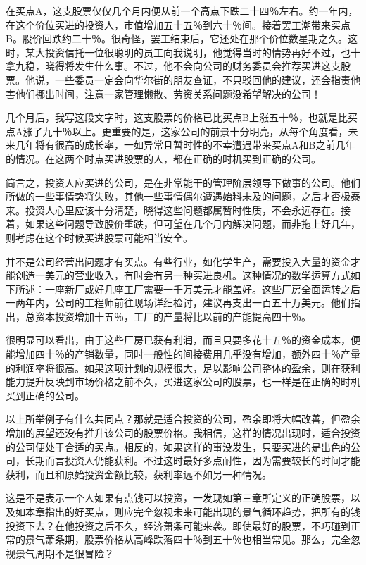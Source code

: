 \documentclass[UTF8,a4paper,zihao=-4,fontset = windows]{ctexart} %
\begin{document}
在买点A，这支股票仅仅几个月内便从前一个高点下跌二十四％左右。约一年内，在这个价位买进的投资人，市值增加五十五％到六十％间。接着罢工潮带来买点B。股价回跌约二十％。很奇怪，罢工结束后，它还处在那个价位数星期之久。这时，某大投资信托一位很聪明的员工向我说明，他觉得当时的情势再好不过，也十拿九稳，晓得将发生什么事。不过，他不会向公司的财务委员会推荐买进这支股票。他说，一些委员一定会向华尔街的朋友查证，不只驳回他的建议，还会指责他害他们挪出时间，注意一家管理懒散、劳资关系问题没希望解决的公司！

几个月后，我写这段文字时，这支股票的价格已比买点B上涨五十％，也就是比买点A涨了九十％以上。更重要的是，这家公司的前景十分明亮，从每个角度看，未来几年将有很高的成长率，一如异常且暂时性的不幸遭遇带来买点A和B之前几年的情况。在这两个时点买进股票的人，都在正确的时机买到正确的公司。

简言之，投资人应买进的公司，是在非常能干的管理阶层领导下做事的公司。他们所做的一些事情势将失败，其他一些事情偶尔遭遇始料未及的问题，之后才否极泰来。投资人心里应该十分清楚，晓得这些问题都属暂时性质，不会永远存在。接着，如果这些问题导致股价重跌，但可望在几个月内解决问题，而非拖上好几年，则考虑在这个时候买进股票可能相当安全。

并不是公司经营出问题才有买点。有些行业，如化学生产，需要投入大量的资金才能创造一美元的营业收入，有时会有另一种买进良机。这种情况的数学运算方式如下所述：一座新厂或好几座工厂需要一千万美元才能盖好。这些厂房全面运转之后一两年内，公司的工程师前往现场详细检讨，建议再支出一百五十万美元。他们指出，总资本投资增加十五％，工厂的产量将比以前的产能提高四十％。

很明显可以看出，由于这些厂房已获有利润，而且只要多花十五％的资金成本，便能增加四十％的产销数量，同时一般性的间接费用几乎没有增加，额外四十％产量的利润率将很高。如果这项计划的规模很大，足以影响公司整体的盈余，则在获利能力提升反映到市场价格之前不久，买进这家公司的股票，也一样是在正确的时机买到正确的公司。

以上所举例子有什么共同点？那就是适合投资的公司，盈余即将大幅改善，但盈余增加的展望还没有推升该公司的股票价格。我相信，这样的情况出现时，适合投资的公司便处于合适的买点。相反的，如果这样的事没发生，只要买进的是出色的公司，长期而言投资人仍能获利。不过这时最好多点耐性，因为需要较长的时间才能获利，而且和原始投资金额比较，获利率远不如另一种情况。

这是不是表示一个人如果有点钱可以投资，一发现如第三章所定义的正确股票，以及如本章指出的好买点，则应完全忽视未来可能出现的景气循环趋势，把所有的钱投资下去？在他投资之后不久，经济萧条可能来袭。即使最好的股票，不巧碰到正常的景气萧条期，股票价格从高峰跌落四十％到五十％也相当常见。那么，完全忽视景气周期不是很冒险？
\end{document}
